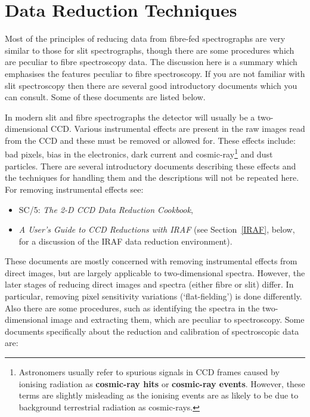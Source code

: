 \documentclass[twoside,11pt]{starlink}
\begin{document}
\section{\label{REDTECH}Data Reduction Techniques}

Most of the principles of reducing data from fibre-fed spectrographs
are very similar to those for slit spectrographs, though there are
some procedures which are peculiar to fibre spectroscopy data.  The
discussion here is a summary which emphasises the features peculiar to
fibre spectroscopy.  If you are not familiar with slit spectroscopy
then there are several good introductory documents which you can
consult.  Some of these documents are listed below.

In modern slit and fibre spectrographs the detector will usually be a
two-dimensional CCD.  Various instrumental effects are present in the
raw images read from the CCD and these must be removed or allowed for.
These effects include: bad pixels, bias in the electronics, dark current
and cosmic-ray\footnote{Astronomers usually refer to spurious signals
in CCD frames caused by ionising radiation as \textbf{cosmic-ray hits} or
\textbf{cosmic-ray events}.  However, these terms are slightly misleading
as the ionising events are as likely to be due to background
terrestrial radiation as cosmic-rays.} and dust particles.  There are
several introductory documents describing these effects and the techniques
for handling them and the descriptions will not be repeated here.  For
removing instrumental effects see:

\begin{itemize}

  \item SC/5: \textit{The 2-D CCD Data Reduction Cookbook}\/\cite{SC5},

  \item \textit{A User's Guide to CCD Reductions with IRAF}\/\cite{MASSEY97}
   (see Section~\ref{IRAF}, below, for a discussion of the IRAF data
   reduction environment).

\end{itemize}

These documents are mostly concerned with removing instrumental effects
from direct images, but are largely applicable to two-dimensional
spectra.  However, the later stages of reducing direct images and
spectra (either fibre or slit) differ.  In particular, removing pixel
sensitivity variations (`flat-fielding') is done differently.  Also
there are some procedures, such as identifying the spectra in the
two-dimensional image and extracting them, which are peculiar to
spectroscopy.  Some documents specifically about the reduction and
calibration of spectroscopic data are:
\end{document}
